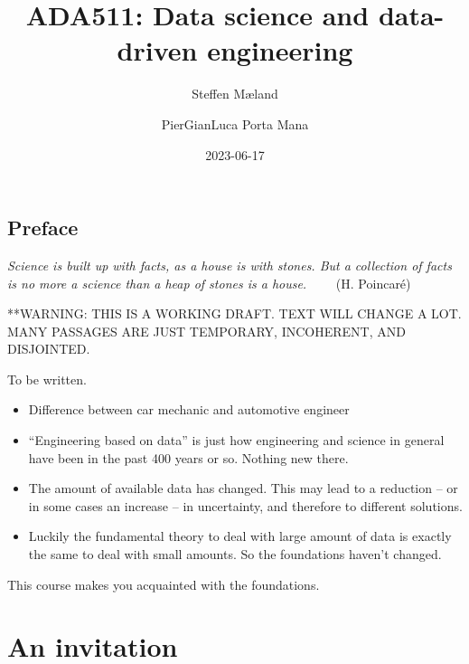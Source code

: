 \documentclass[
  a4paper,
  DIV=11,
  numbers=noendperiod,
  oneside]{scrreprt}
\title{ADA511: Data science and data-driven engineering}
\author{Steffen Mæland \and PierGianLuca Porta Mana}
\date{2023-06-17}
\renewcommand*\contentsname{Table of contents}
\newcommand\contentsname{Table of contents}
\begin{document}
\maketitle
\ifdefined\Shaded\renewenvironment{Shaded}{\begin{tcolorbox}[frame hidden, boxrule=0pt, interior hidden, breakable, sharp corners, borderline west={3pt}{0pt}{shadecolor}, enhanced]}{\end{tcolorbox}}\fi

\renewcommand*\contentsname{Table of contents}
{
\hypersetup{linkcolor=}
\setcounter{tocdepth}{2}
\tableofcontents
}

\hypertarget{preface}{%
\chapter*{Preface}\label{preface}}


\hfill\break
\hfill\break
\hfill\break
\hfill\break
\hfill\break
\hfill\break

\emph{Science is built up with facts, as a house is with stones. But a
collection of facts is no more a science than a heap of stones is a
house.} ~~~~{(H. Poincaré)}

**WARNING: THIS IS A WORKING DRAFT. TEXT WILL CHANGE A LOT. MANY
PASSAGES ARE JUST TEMPORARY, INCOHERENT, AND DISJOINTED.

To be written.

\begin{itemize}
\item
  Difference between car mechanic and automotive engineer
\item
  ``Engineering based on data'' is just how engineering and science in
  general have been in the past 400 years or so. Nothing new there.
\item
  The amount of available data has changed. This may lead to a reduction
  -- or in some cases an increase -- in uncertainty, and therefore to
  different solutions.
\item
  Luckily the fundamental theory to deal with large amount of data is
  exactly the same to deal with small amounts. So the foundations
  haven't changed.
\end{itemize}

This course makes you acquainted with the foundations.

\part{An invitation}
\end{document}
